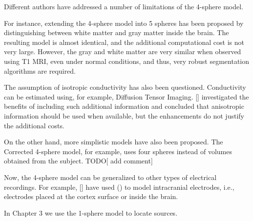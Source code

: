 Different authors have addressed a number of limitations of the 4-sphere model.

For instance, extending the 4-sphere model into 5 spheres has been proposed by distinguishing between white matter and gray matter inside the brain.
%
The resulting model is almost identical, and the additional computational cost is not very large. 
%
However, the gray and white matter are very similar when observed using T1 MRI, even under normal conditions, and thus, very robust segmentation algorithms are required.

The assumption of isotropic conductivity has also been questioned.
%
Conductivity can be estimated using, for example, Diffusion Tensor Imaging.
%
[] investigated the benefits of including such additional information and concluded that anisotropic information should be used when available, but the enhancements do not justify the additional costs.

On the other hand, more simplistic models have also been proposed.
%
The Corrected 4-sphere model, for example, uses four spheres instead of volumes obtained from the subject.
%
TODO[ add comment]

Now, the 4-sphere model can be generalized to other types of electrical recordings.
%
For example, [] have used () to model intracranial electrodes, i.e., electrodes placed at the cortex surface or inside the brain.

In Chapter 3 we use the 1-sphere model to locate sources. 